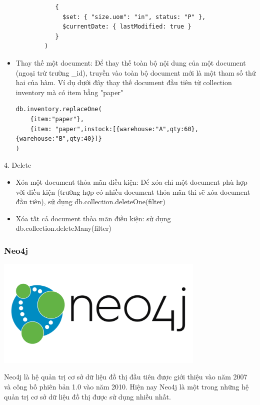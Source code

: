 \begin{description}
\begin{itemize}
\begin{verbatim}
           {
             $set: { "size.uom": "in", status: "P" },
             $currentDate: { lastModified: true }
           }
        )
    \end{verbatim}
    \item Thay thế một document: Để thay thế toàn bộ nội dung của một document (ngoại trừ trường \_id), truyền vào toàn bộ document mới là một tham số thứ hai của hàm. Ví dụ dưới đây thay thế document đầu tiên từ collection inventory mà có item bằng "paper"
\begin{verbatim}
db.inventory.replaceOne(
    {item:"paper"},
    {item: "paper",instock:[{warehouse:"A",qty:60},{warehouse:"B",qty:40}]}
)
\end{verbatim}
\end{itemize}
\item 4. Delete\\
\begin{itemize}
    \item Xóa một document thỏa mãn điều kiện: Để xóa chỉ một document phù hợp với điều kiện (trường hợp có nhiều document thỏa mãn thì sẽ xóa document đầu tiên), sử dụng db.collection.deleteOne(filter)
    \item Xóa tất cả document thỏa mãn điều kiện: sử dụng db.collection.deleteMany(filter)

\end{itemize}
\end{description}

\subsubsection{Neo4j}
\begin{center}
  \captionsetup{type=figure}
  \includegraphics[width=10cm]{img/neo4j.png}
\end{center}

Neo4j là hệ quản trị cơ sở dữ liệu đồ thị đầu tiên được giới thiệu vào năm 2007 và công bố phiên bản 1.0 vào năm 2010. Hiện nay Neo4j là một trong những hệ quản trị cơ sở dữ liệu đồ thị được sử dụng nhiều nhất.

